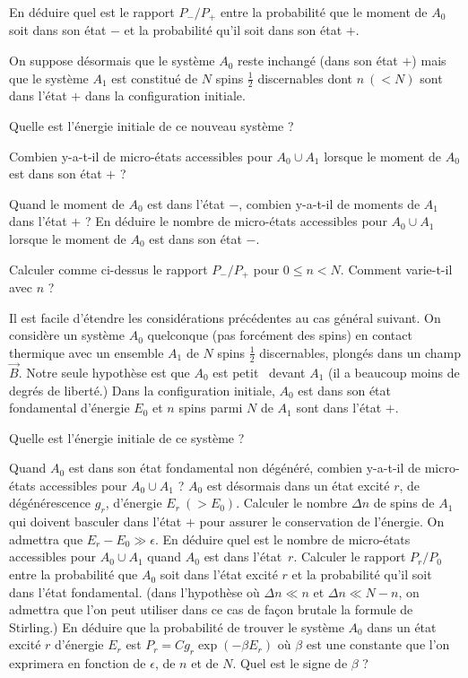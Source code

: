 \documentclass[utf8, 11pt]{feuille}
\begin{document}
\question En déduire quel est le rapport $P_-/P_+$ entre la probabilité que le moment de $A_0$ soit dans son état $-$ et la probabilité qu'il soit dans son état $+$.

\medskip

On suppose désormais que le  système $A_0$ reste inchangé (dans son état $+$) mais que le système $A_1$ est constitué de $N$ spins $\frac{1}{2}$ discernables dont $n \ (< N)$ sont dans l'état $+$ dans la configuration initiale.

\medskip

\question Quelle est l'énergie initiale de ce nouveau système ?

\question Combien y-a-t-il de micro-états accessibles pour $A_0 \cup A_1$ lorsque le moment de $A_0$ est dans son état $+$ ? 

\question Quand le moment de $A_0$ est dans l'état $-$, combien y-a-t-il de moments de $A_1$ dans l'état $+$ ? En déduire le nombre de micro-états accessibles pour $A_0 \cup A_1$ lorsque le moment de $A_0$ est dans son état $-$.

\question Calculer comme ci-dessus le rapport $P_-/P_+$ pour $0 \le n < N$. Comment varie-t-il avec $n$ ?

\medskip

Il est facile d'étendre les considérations précédentes au cas général suivant.  On considère un système $A_0$ quelconque (pas forcément des spins) en contact thermique avec un ensemble $A_1$ de $N$ spins $\frac{1}{2}$ discernables, plongés dans un champ $\vec B$. Notre seule hypothèse est que $A_0$ est \og petit \fg \ devant $A_1$ (il a beaucoup moins de degrés de liberté.) Dans la configuration initiale, $A_0$ est dans son état fondamental d'énergie $E_0$ et $n$ spins parmi $N$ de $A_1$ sont dans l'état $+$.

\medskip

\question Quelle est l'énergie initiale de ce système ?

\question Quand $A_0$ est dans son état fondamental non dégénéré, combien y-a-t-il de micro-états accessibles pour $A_0 \cup A_1$ ?
\question $A_0$ est désormais dans un état excité $r$, de dégénérescence $g_r$, d'énergie $E_r \ (>E_0)$. Calculer le nombre $\Delta n$ de spins de $A_1$ qui doivent basculer dans l'état $+$ pour assurer le conservation de l'énergie. On admettra que $E_r-E_0 \gg \epsilon$. En déduire quel est le nombre de micro-états accessibles pour $A_0 \cup A_1$ quand $A_0$ est dans \mbox{l'état $r$}.
\question Calculer le rapport $P_r/P_0$ entre la probabilité que $A_0$ soit dans l'état excité $r$ et la probabilité qu'il soit dans l'état  fondamental. (dans l'hypothèse où $\Delta n \ll n$ et $\Delta n \ll N-n$, on admettra que l'on peut utiliser dans ce cas de façon brutale la formule de Stirling.)
\question En déduire que la probabilité de trouver le système $A_0$ dans un état excité $r$ d'énergie $E_r$ est \mbox{$P_r=C g_r \exp(-\beta E_r)$} où $\beta $ est une constante que l'on exprimera en fonction de $\epsilon$, de $n$ et de $N$. Quel est le signe de $\beta $ ?
\\
\end{document}
